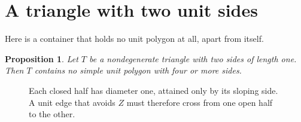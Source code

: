 \documentclass[11pt]{article}
\newtheorem{proposition}{Proposition}
\theoremstyle{remark}
\begin{document}
\section{A triangle with two unit sides}

Here is a container that holds no unit polygon at all, apart from itself.

\begin{proposition}\label{prop:triangle}
Let $T$ be a nondegenerate triangle with two sides of length one. Then $T$ contains no
simple unit polygon with four or more sides.
\end{proposition}

\begin{figure}[ht]
\centering
{}
\caption{Each closed half has diameter one, attained only by its sloping side. A unit edge
that avoids $Z$ must therefore cross from one open half to the other.}
\label{fig:triangle}
\end{figure}
\end{document}
